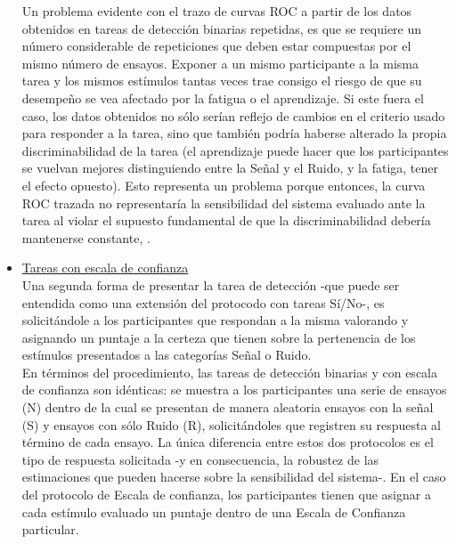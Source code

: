 \begin{itemize}
Un problema evidente con el trazo de curvas ROC a partir de los datos obtenidos en tareas de detección binarias repetidas, es que se requiere un número considerable de repeticiones que deben estar compuestas por el mismo número de ensayos. Exponer a un mismo participante a la misma tarea y los mismos estímulos tantas veces trae consigo el riesgo de que su desempeño se vea afectado por la fatigua o el aprendizaje. Si este fuera el caso, los datos obtenidos no sólo serían reflejo de cambios en el criterio usado para responder a la tarea, sino que también podría haberse alterado la propia discriminabilidad de la tarea (el aprendizaje puede hacer que los participantes se vuelvan mejores distinguiendo entre la Señal y el Ruido, y la fatiga, tener el efecto opuesto). Esto representa un problema porque entonces, la curva ROC trazada no representaría la sensibilidad del sistema evaluado ante la tarea al violar el supuesto fundamental de que la discriminabilidad debería mantenerse constante, \parencite{McNicol2}.\\

\item \underline{Tareas con escala de confianza}\\

Una segunda forma de presentar la tarea de detección -que puede ser entendida como una extensión del protocodo con tareas Sí/No-, es solicitándole a los participantes que respondan a la misma valorando y asignando un puntaje a la certeza que tienen sobre la pertenencia de los estímulos presentados a las categorías Señal o Ruido.\\

En términos del procedimiento, las tareas de detección binarias y con escala de confianza son idénticas: se muestra a los participantes una serie de ensayos (N) dentro de la cual se presentan de manera aleatoria ensayos con la señal (S) y ensayos con sólo Ruido (R), solicitándoles que registren su respuesta al término de cada ensayo. La única diferencia entre estos dos protocolos es el tipo de respuesta solicitada -y en consecuencia, la robustez de las estimaciones que pueden hacerse sobre la sensibilidad del sistema-. En el caso del protocolo de Escala de confianza, los participantes tienen que asignar a cada estímulo evaluado un puntaje dentro de una Escala de Confianza particular.\\


\end{itemize}
